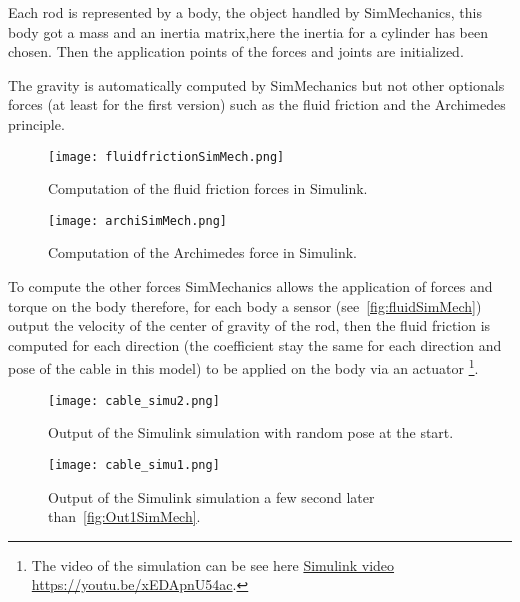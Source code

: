 Each rod is represented by a body, the object handled by SimMechanics, this body got a mass and an inertia matrix,here the inertia for a cylinder has been chosen. Then the application points of the forces and joints are
initialized.

The gravity is automatically computed by SimMechanics but not other optionals forces (at least for the first version) such as the fluid friction and the Archimedes principle. 

\begin{figure}[H]
\centering
    \begin{minipage}[b]{0.4\textwidth}
    \centering
    \texttt{[image: fluidfrictionSimMech.png]}
    \caption{Computation of the fluid friction forces in Simulink.}
    \label{fig:fluidSimMech}
    \end{minipage}
    \hfill
    \begin{minipage}[b]{0.4\textwidth}
    \centering
    \texttt{[image: archiSimMech.png]}
    \caption{Computation of the Archimedes force in Simulink.}
    \label{fig:archSimMech}
    \end{minipage}
\end{figure}

To compute the other forces SimMechanics allows the application of forces and torque on the body therefore, for each body a sensor (see~\ref{fig:fluidSimMech}) output the velocity of the center of gravity of the rod, then the  fluid friction is computed for each direction (the coefficient stay the same for each direction and pose of the cable in this model) to be applied on the body via an actuator \footnote{The video of the simulation can be see here \href{https://youtu.be/xEDApnU54ac}{Simulink video https://youtu.be/xEDApnU54ac}.}.

\begin{figure}[H]
\centering
    \begin{minipage}[b]{0.5\textwidth}
    \centering
    \texttt{[image: cable\_simu2.png]}
    \caption{Output of the Simulink simulation with random pose at the start.}
    \label{fig:Out1SimMech}
    \end{minipage}
    \hfill
    \begin{minipage}[b]{0.45\textwidth}
    \centering
    \texttt{[image: cable\_simu1.png]}
    \caption{Output of the Simulink simulation a few second later than~\ref{fig:Out1SimMech}.}
    \label{fig:Out2SimMech}
    \end{minipage}
\end{figure}


